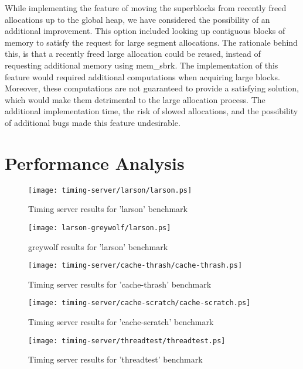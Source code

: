 \documentclass{article}
\begin{document}
While implementing the feature of moving the superblocks from recently freed 
allocations up to the global heap, we have considered the possibility of an 
additional improvement. This option included looking up contiguous blocks
of memory to satisfy the request for large segment allocations. The rationale
behind this, is that a recently freed large allocation could be reused, instead
of requesting additional memory using mem\_sbrk. The implementation of this 
feature would required additional computations when acquiring large blocks.
Moreover, these computations are not guaranteed to provide a satisfying 
solution, which would make them detrimental to the large allocation process.
The additional implementation time, the risk of slowed allocations, and the 
possibility of additional bugs made this feature undesirable.

\newpage
\section{Performance Analysis}
\label{sec:performance}


\begin{figure}[h]
    \centering
    \texttt{[image: timing-server/larson/larson.ps]}
    \caption{Timing server results for 'larson' benchmark}
    \label{fig:t-larson}
\end{figure}

\begin{figure}[h]
    \centering
    \texttt{[image: larson-greywolf/larson.ps]}
    \caption{greywolf results for 'larson' benchmark}
    \label{fig:g-larson}
\end{figure}

\begin{figure}[h]
    \centering
    \texttt{[image: timing-server/cache-thrash/cache-thrash.ps]}
    \caption{Timing server results for 'cache-thrash' benchmark}
    \label{fig:t-cache-thrash}
\end{figure}

\begin{figure}[h]
    \centering
    \texttt{[image: timing-server/cache-scratch/cache-scratch.ps]}
    \caption{Timing server results for 'cache-scratch' benchmark}
    \label{fig:t-cache-scratch}
\end{figure}

\begin{figure}[h]
    \centering
    \texttt{[image: timing-server/threadtest/threadtest.ps]}
    \caption{Timing server results for 'threadtest' benchmark}
    \label{fig:t-threadtest}
\end{figure}
\end{document}
